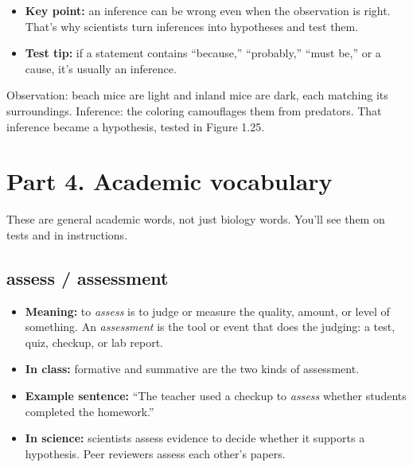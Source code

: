 \documentclass[11pt,letterpaper]{article}
\begin{document}
\begin{itemize}
  \item \textbf{Key point:} an inference can be wrong even when the observation is right. That's why scientists turn inferences into hypotheses and test them.
  \item \textbf{Test tip:} if a statement contains ``because,'' ``probably,'' ``must be,'' or a cause, it's usually an inference.
\end{itemize}

  {Observation: beach mice are light and inland mice are dark, each matching its surroundings. Inference: the coloring camouflages them from predators. That inference became a hypothesis, tested in Figure 1.25.}

\section{Part 4. Academic vocabulary}

These are general academic words, not just biology words. You'll see them on tests and in instructions.

\subsection{assess / assessment}
\begin{itemize}
  \item \textbf{Meaning:} to \emph{assess} is to judge or measure the quality, amount, or level of something. An \emph{assessment} is the tool or event that does the judging: a test, quiz, checkup, or lab report.
  \item \textbf{In class:} formative and summative are the two kinds of assessment.
  \item \textbf{Example sentence:} ``The teacher used a checkup to \emph{assess} whether students completed the homework.''
  \item \textbf{In science:} scientists assess evidence to decide whether it supports a hypothesis. Peer reviewers assess each other's papers.
\end{itemize}
\end{document}
